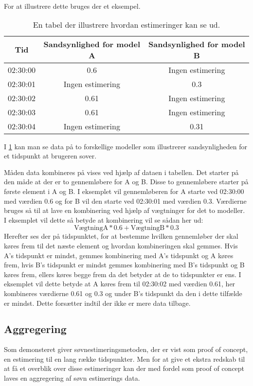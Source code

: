 For at illustrere dette bruges der et eksempel.

\newcommand{\nv}{Ingen estimering}

\begin{table}[h]
\centering
\begin{tabular}{|c|c|c|}
\hline Tid & Sandsynlighed for model A & Sandsynlighed for model B \\ 
\hline 02:30:00 & 	0.6     & \nv \\ 
\hline 02:30:01 & 	\nv     & 0.3 \\ 
\hline 02:30:02 & 	0.61    & \nv \\ 
\hline 02:30:03 & 	0.61    & \nv \\ 
\hline 02:30:04 & 	\nv     & 0.31 \\ 
\hline 
\end{tabular} 
\caption{En tabel der illustrere hvordan estimeringer kan se ud.}
\label{tab:combiModelsExample}
\end{table}

I \cref{tab:combiModelsExample} kan man se data på to forskellige modeller som illustrerer sandsynligheden for et tidspunkt at brugeren sover.

Måden data kombineres på vises ved hjælp af dataen i tabellen.
Det starter på den måde at der er to gennemløbere for A og B. 
Disse to gennemløbere starter på første element i A og B. 
I eksemplet vil gennemløberen for A starte ved 02:30:00 med værdien 0.6 og for B vil den starte ved 02:30:01 med værdien 0.3.
Værdierne bruges så til at lave en kombinering ved hjælp af vægtninger for det to modeller. I eksemplet vil dette så betyde at kombinering vil se sådan her ud: $$\text{VægtningA} * 0.6 + \text{VægtningB} * 0.3$$
Herefter ses der på tidspunktet, for at bestemme hvilken gennemløber der skal køres frem til det næste element og hvordan kombineringen skal gemmes.
Hvis A's tidspunkt er mindst, gemmes kombinering med A's tidspunkt og A køres frem, hvis B's tidspunkt er mindst gemmes kombinering med B's tidspunkt og B køres frem, ellers køres begge frem da det betyder at de to tidspunkter er ens.
I eksemplet vil dette betyde at A køres frem til 02:30:02 med værdien 0.61, her kombineres værdierne 0.61 og 0.3 og under B's tidspunkt da den i dette tilfælde er mindst.
Dette forsætter indtil der ikke er mere data tilbage.

\subsection{Aggregering}\label{subsec:soevnaggre}
Som demonsteret giver søvnestimeringsmetoden, der er vist som proof of concept, en estimering til en lang række tidspunkter.
Men for at give et ekstra redskab til at få et overblik over disse estimeringer kan der med fordel som proof of concept laves en aggregering af søvn estimerings data.

